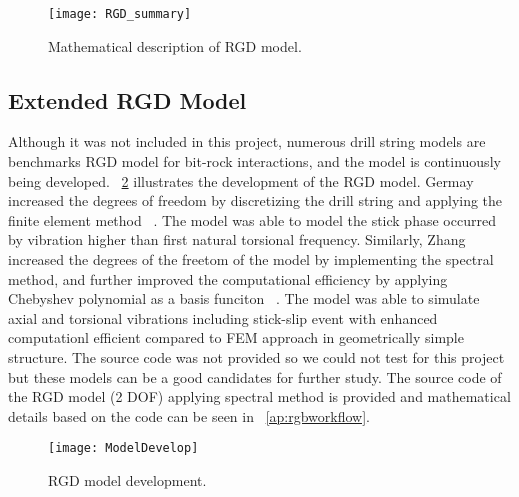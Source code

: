\begin{figure}[!hbt]
  \centering
  \texttt{[image: RGD\_summary]}
  \caption[Mathematical description of RGD model]{Mathematical description of RGD model.}\label{figure_RGD_Summary}
\end{figure}

\subsection{Extended RGD Model}
Although it was not included in this project, numerous drill string models are benchmarks RGD model for bit-rock interactions, and the model is continuously being developed. \figurename~\ref{model_develop_figure} illustrates the development of the RGD model. Germay increased the degrees of freedom by discretizing the drill string and applying the finite element method ~\cite{ref:germay2009a}. The model was able to model the stick phase occurred by vibration higher than first natural torsional frequency. Similarly, Zhang increased the degrees of the freetom of the model by implementing the spectral method, and further improved the computational efficiency by applying Chebyshev polynomial as a basis funciton ~\cite{ref:zhang2020a}. The model was able to simulate axial and torsional vibrations including stick-slip event with enhanced computationl efficient compared to FEM approach in geometrically simple structure. The source code was not provided so we could not test for this project but these models can be a good candidates for further study. The source code of the RGD model (2 DOF) applying spectral method is provided and mathematical details based on the code can be seen in \appendixname~\ref{ap:rgbworkflow}.

\begin{figure}[ht]
  \centering
  \texttt{[image: ModelDevelop]}
  \caption[RGD model development]{RGD model development.}\label{model_develop_figure}
\end{figure} 